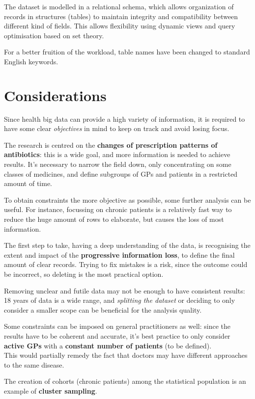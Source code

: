 The dataset is modelled in a relational schema, which allows organization of records in structures (tables) to maintain integrity and compatibility between different kind of fields. This allows flexibility using dynamic views and query optimisation based on set theory. 

For a better fruition of the workload, table names have been changed to standard English keywords.

\section{Considerations}
Since health big data can provide a high variety of information, it is required to have some clear \textit{objectives} in mind to keep on track and avoid losing focus. 

The research is centred on the \textbf{changes of prescription patterns of antibiotics}: this is a wide goal, and more information is needed to achieve results. It's necessary to narrow the field down, only concentrating on some classes of medicines, and define subgroups of GPs and patients in a restricted amount of time.

To obtain constraints the more objective as possible, some further analysis can be useful. For instance, focussing on chronic patients is a relatively fast way to reduce the huge amount of rows to elaborate, but causes the loss of most information.

The first step to take, having a deep understanding of the data, is recognising the extent and impact of the \textbf{progressive information loss}, to define the final amount of clear records. Trying to fix mistakes is a risk, since the outcome could be incorrect, so deleting is the most practical option.

Removing unclear and futile data may not be enough to have consistent results: 18 years of data is a wide range, and \textit{splitting the dataset} or deciding to only consider a smaller scope can be beneficial for the analysis quality. 

Some constraints can be imposed on general practitioners as well: since the results have to be coherent and accurate, it's best practice to only consider \textbf{active GPs} with a \textbf{constant number of patients} (to be defined). \\ This would partially remedy the fact that doctors may have different approaches to the same disease.

The creation of cohorts (chronic patients) among the statistical population is an example of \textbf{cluster sampling}.

